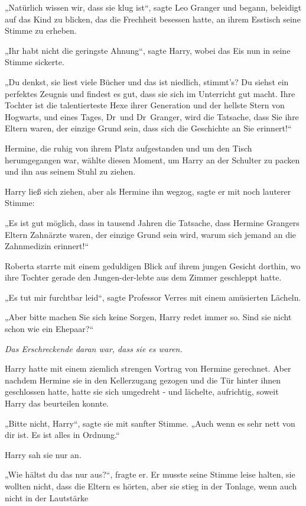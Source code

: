 {„Natürlich wissen wir, dass sie klug ist“, sagte Leo Granger und begann, beleidigt auf das Kind zu blicken, das die Frechheit besessen hatte, an ihrem Esstisch seine Stimme zu erheben.

„Ihr habt nicht die geringste Ahnung“, sagte Harry, wobei das Eis nun in seine Stimme sickerte.

„Du denkst, sie liest viele Bücher und das ist niedlich, stimmt's? Du siehst ein perfektes Zeugnis und findest es gut, dass sie sich im Unterricht gut macht. Ihre Tochter ist die talentierteste Hexe ihrer Generation und der hellste Stern von Hogwarts, und eines Tages, Dr~und Dr~Granger, wird die Tatsache, dass Sie ihre Eltern waren, der einzige Grund sein, dass sich die Geschichte an Sie erinnert!“

Hermine, die ruhig von ihrem Platz aufgestanden und um den Tisch herumgegangen war, wählte diesen Moment, um Harry an der Schulter zu packen und ihn aus seinem Stuhl zu ziehen.

Harry ließ sich ziehen, aber als Hermine ihn wegzog, sagte er mit noch lauterer Stimme:

„Es ist gut möglich, dass in tausend Jahren die Tatsache, dass Hermine Grangers Eltern Zahnärzte waren, der einzige Grund sein wird, warum sich jemand an die Zahnmedizin erinnert!“

Roberta starrte mit einem geduldigen Blick auf ihrem jungen Gesicht dorthin, wo ihre Tochter gerade den Jungen-der-lebte aus dem Zimmer geschleppt hatte.

„Es tut mir furchtbar leid“, sagte Professor Verres mit einem amüsierten Lächeln.

„Aber bitte machen Sie sich keine Sorgen, Harry redet immer so. Sind sie nicht schon wie ein Ehepaar?“

\emph{Das Erschreckende daran war, dass sie es waren.}

Harry hatte mit einem ziemlich strengen Vortrag von Hermine gerechnet. Aber nachdem Hermine sie in den Kellerzugang gezogen und die Tür hinter ihnen geschlossen hatte, hatte sie sich umgedreht - und lächelte, aufrichtig, soweit Harry das beurteilen konnte.

„Bitte nicht, Harry“, sagte sie mit sanfter Stimme. „Auch wenn es sehr nett von dir ist. Es ist alles in Ordnung.“

Harry sah sie nur an.

„Wie hältst du das nur aus?“, fragte er. Er musste seine Stimme leise halten, sie wollten nicht, dass die Eltern es hörten, aber sie stieg in der Tonlage, wenn auch nicht in der Lautstärke

}
